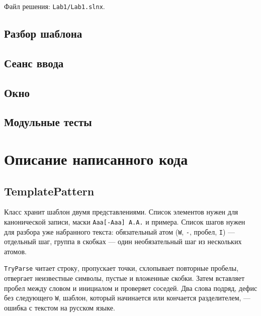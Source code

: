 \documentclass[a4paper,14pt]{extarticle}
\begin{document}
Файл решения: \texttt{Lab1/Lab1.slnx}.

\subsection{Разбор шаблона}

\subsection{Сеанс ввода}

\subsection{Окно}

\subsection{Модульные тесты}

\section{Описание написанного кода}

\subsection{TemplatePattern}

Класс хранит шаблон двумя представлениями. Список элементов нужен для канонической записи, маски \texttt{Ааа[-Ааа] А.А.} и примера. Список шагов нужен для разбора уже набранного текста: обязательный атом (\texttt{W}, \texttt{-}, пробел, \texttt{I}) --- отдельный шаг, группа в скобках --- один необязательный шаг из нескольких атомов.

\texttt{TryParse} читает строку, пропускает точки, схлопывает повторные пробелы, отвергает неизвестные символы, пустые и вложенные скобки. Затем вставляет пробел между словом и инициалом и проверяет соседей. Два слова подряд, дефис без следующего \texttt{W}, шаблон, который начинается или кончается разделителем, --- ошибка с текстом на русском языке.
\end{document}
